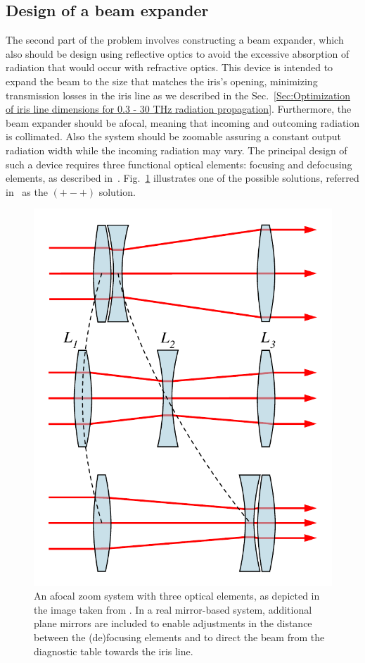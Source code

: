     \subsection{Design of a beam expander}

    The second part of the problem involves constructing a beam expander, which also should be design using reflective optics to avoid the excessive absorption of radiation that would occur with refractive optics. This device is intended to expand the beam to the size that matches the iris's opening, minimizing transmission losses in the iris line as we described in the Sec.~\ref{Sec:Optimization of iris line dimensions for 0.3 - 30 THz radiation propagation}. Furthermore, the beam expander should be afocal, meaning that incoming and outcoming radiation is collimated. Also the system should be zoomable assuring a constant output radiation width while the incoming radiation may vary. The principal design of such a device requires three functional optical elements: focusing and defocusing elements, as described in~. Fig.~\ref{Fig:Zoomlens} illustrates one of the possible solutions, referred in~ as the $(+-+)$ solution.
    \begin{figure}[h]
    	\centering
    		\includegraphics[trim={0 0cm 0 0cm}, width=0.45\linewidth]{content/images/transport/Zoomlens.pdf}
    		\centering
            \captionsetup{justification=centering}
        	\caption{An afocal zoom system with three optical elements, as depicted in the image taken from . In a real mirror-based system, additional plane mirrors are included to enable adjustments in the distance between the (de)focusing elements and to direct the beam from the diagnostic table towards the iris line.}
        \label{Fig:Zoomlens}
    \end{figure}
    
